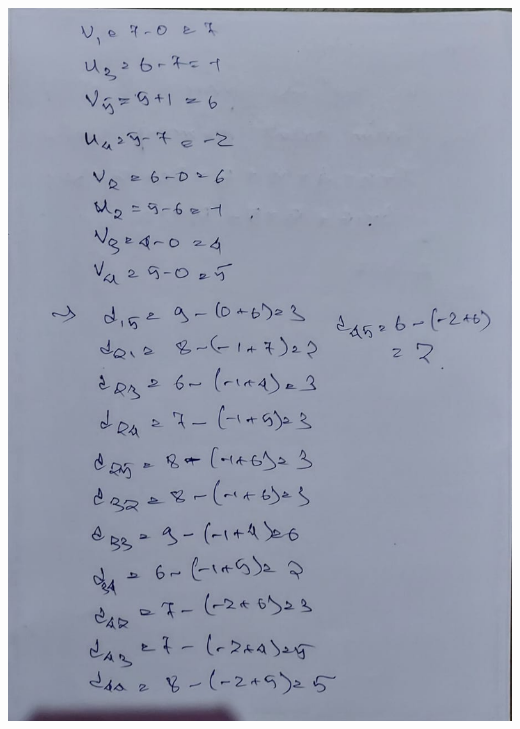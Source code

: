 \documentclass[12pt, letterpaper, twoside]{book}
\begin{document}
\includegraphics[width=\paperwidth, height=\paperheight]{Page23}
\end{document}
